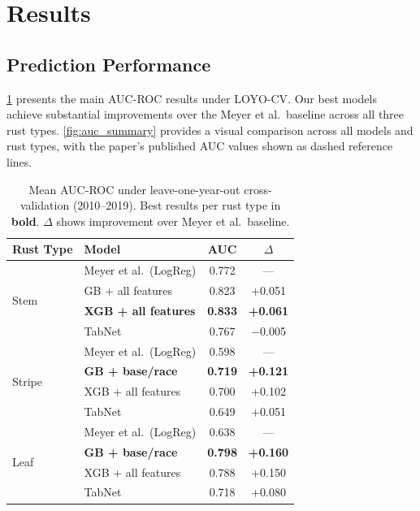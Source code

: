 \documentclass[10pt,twocolumn,letterpaper]{article}
\begin{document}
\section{Results}
\label{sec:results}

\subsection{Prediction Performance}

\cref{tab:main_results} presents the main AUC-ROC results under LOYO-CV. Our best models achieve substantial improvements over the Meyer et al.\ baseline across all three rust types. \cref{fig:auc_summary} provides a visual comparison across all models and rust types, with the paper's published AUC values shown as dashed reference lines.

\begin{table}[t]
\centering
\caption{Mean AUC-ROC under leave-one-year-out cross-validation (2010--2019). Best results per rust type in \textbf{bold}. $\Delta$ shows improvement over Meyer et al.\ baseline.}
\label{tab:main_results}
\small
\begin{tabular}{@{}llcc@{}}
\toprule
\textbf{Rust Type} & \textbf{Model} & \textbf{AUC} & \textbf{$\Delta$} \\
\midrule
\multirow{4}{*}{Stem}
  & Meyer et al.\ (LogReg)  & 0.772 & --- \\
  & GB + all features        & 0.823 & +0.051 \\
  & \textbf{XGB + all features} & \textbf{0.833} & \textbf{+0.061} \\
  & TabNet                   & 0.767 & $-$0.005 \\
\midrule
\multirow{4}{*}{Stripe}
  & Meyer et al.\ (LogReg)  & 0.598 & --- \\
  & \textbf{GB + base/race}  & \textbf{0.719} & \textbf{+0.121} \\
  & XGB + all features       & 0.700 & +0.102 \\
  & TabNet                   & 0.649 & +0.051 \\
\midrule
\multirow{4}{*}{Leaf}
  & Meyer et al.\ (LogReg)  & 0.638 & --- \\
  & \textbf{GB + base/race}  & \textbf{0.798} & \textbf{+0.160} \\
  & XGB + all features       & 0.788 & +0.150 \\
  & TabNet                   & 0.718 & +0.080 \\
\bottomrule
\end{tabular}
\end{table}
\end{document}
